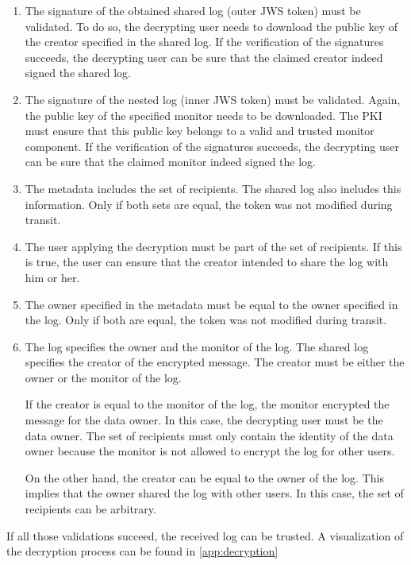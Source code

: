 \documentclass[../main.tex]{subfiles}
\begin{document}
\begin{enumerate}
    \item 
    The signature of the obtained shared log (outer JWS token) must be validated.
    To do so, the decrypting user needs to download the public key of the creator specified in the shared log.
    If the verification of the signatures succeeds, the decrypting user can be sure that the claimed creator indeed signed the shared log.
    \item
    The signature of the nested log (inner JWS token) must be validated.
    Again, the public key of the specified monitor needs to be downloaded.
    The PKI must ensure that this public key belongs to a valid and trusted monitor component.
    If the verification of the signatures succeeds, the decrypting user can be sure that the claimed monitor indeed signed the log.
    \item
    The metadata includes the set of recipients.
    The shared log also includes this information.
    Only if both sets are equal, the token was not modified during transit.
    \item
    The user applying the decryption must be part of the set of recipients.
    If this is true, the user can ensure that the creator intended to share the log with him or her.
    \item
    The owner specified in the metadata must be equal to the owner specified in the log.
    Only if both are equal, the token was not modified during transit.
    \item
    The log specifies the owner and the monitor of the log.
    The shared log specifies the creator of the encrypted message.
    The creator must be either the owner or the monitor of the log.
    
    If the creator is equal to the monitor of the log, the monitor encrypted the message for the data owner.
    In this case, the decrypting user must be the data owner.
    The set of recipients must only contain the identity of the data owner because the monitor is not allowed to encrypt the log for other users.

    On the other hand, the creator can be equal to the owner of the log.
    This implies that the owner shared the log with other users.
    In this case, the set of recipients can be arbitrary.
\end{enumerate}
If all those validations succeed, the received log can be trusted.
A visualization of the decryption process can be found in \cref{app:decryption}
\end{document}
